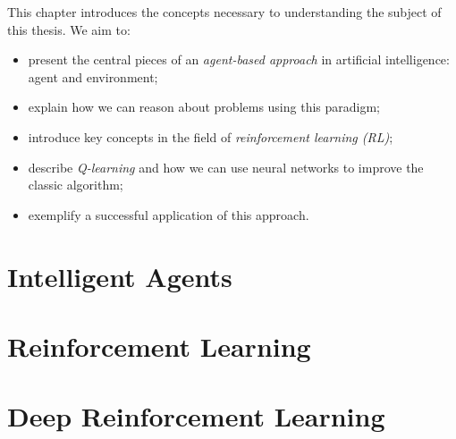 This chapter introduces the concepts necessary to understanding the subject of this thesis.
We aim to:
\begin{itemize}
    \item present the central pieces of an \emph{agent-based approach} in artificial intelligence: agent and environment;
    \item explain how we can reason about problems using this paradigm;
    \item introduce key concepts in the field of \emph{reinforcement learning (RL)};
    \item describe \emph{Q-learning} and how we can use neural networks to improve the classic algorithm;
    \item exemplify a successful application of this approach.
\end{itemize}

\section{Intelligent Agents} \label{agents-intro}


\section{Reinforcement Learning} \label{reinforcement-learning}


\section{Deep Reinforcement Learning} \label{deep-rl}
